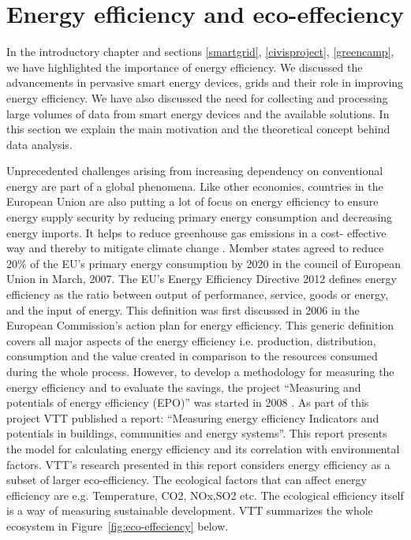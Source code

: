 \section{Energy efficiency and eco-effeciency} \label{ecoeff}
In the introductory chapter and sections \ref{smartgrid}, \ref{civisproject}, \ref{greencamp}, we have highlighted the importance of energy efficiency. We discussed the advancements in pervasive smart energy devices, grids and their role in improving energy efficiency.  We have also discussed the need for collecting and processing large volumes of data from smart energy devices and the available solutions. In this section we explain the main motivation and the theoretical concept behind data analysis.  

Unprecedented challenges arising from increasing dependency on conventional energy are part of a global phenomena. Like other economies, countries in the European Union are also putting a lot of focus on energy efficiency to ensure energy supply security  by reducing primary energy consumption and decreasing energy imports. It helps to reduce greenhouse gas emissions in a cost- effective way and thereby to mitigate climate change \cite{eu2012ee}. Member states agreed to reduce 20\% of the EU's primary energy consumption by 2020 in the council of European Union in March, 2007. The EU's Energy Efficiency Directive 2012 \cite{eu2012ee} defines energy efficiency as the ratio between output of performance, service, goods or energy, and the input of energy. This definition was first discussed in 2006 in the European Commission's action plan for energy efficiency. This generic definition covers all major aspects of the energy efficiency i.e. production, distribution, consumption and the value created in comparison to the resources consumed during the whole process.  However, to develop a methodology for measuring the energy efficiency and to evaluate the savings, the project ``Measuring and potentials of energy efficiency (EPO)'' was started in 2008 \cite{arundel2009measuring}. As part of this project VTT published a report: ``Measuring energy efficiency Indicators and potentials in buildings, communities and energy systems''\cite{forsstrommeasuring}. This report presents the model for calculating energy efficiency and its correlation with environmental factors.  VTT's research presented in this report considers energy efficiency as a subset of larger eco-efficiency. The ecological factors that can affect energy efficiency are e.g.  Temperature, CO2, NOx,SO2 etc. The ecological efficiency itself is a way of measuring sustainable development. VTT summarizes the whole ecosystem in Figure~\ref{fig:eco-effeciency} below.

